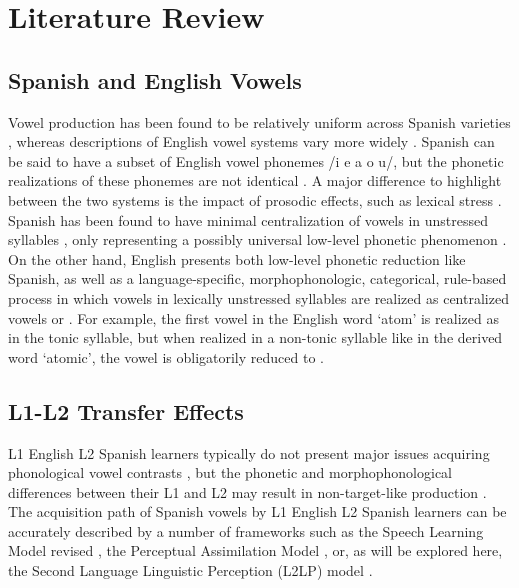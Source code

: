\documentclass[
  a4paper,
  11pt,
  twocolumn]{article}
\begin{document}
\section{Literature Review}

\subsection{Spanish and English Vowels}

Vowel production has been found to be relatively uniform across Spanish
varieties \cite{tomas1957documentos,quilis1993tratado}, whereas
descriptions of English vowel systems vary more widely
\cite{ladefoged2015course,bradlow1995comparative}. Spanish can be said
to have a subset of English vowel phonemes /i e a o u/, but the phonetic
realizations of these phonemes are not identical
\cite{bradlow1995comparative}. A major difference to highlight between
the two systems is the impact of prosodic effects, such as lexical
stress \cite{gordon2017acoustic}. Spanish has been found to have minimal
centralization of vowels in unstressed syllables
\cite{martinez1984fonetica,tomas1957documentos}, only representing a
possibly universal low-level phonetic phenomenon
\cite{kapatsinski2020vowel}. On the other hand, English presents both
low-level phonetic reduction like Spanish, as well as a
language-specific, morphophonologic, categorical, rule-based process in
which vowels in lexically unstressed syllables are realized as
centralized vowels \textipa{[I]} or \textipa{[@]}
\cite{bybee2003phonology,barnes2008strength,fourakis1991tempo}. For
example, the first vowel in the English word `atom' is realized as
\textipa{[\ae]} in the tonic syllable, but when realized in a non-tonic
syllable like in the derived word `atomic', the vowel is obligatorily
reduced to \textipa{[@]}.

\subsection{L1-L2 Transfer Effects}

L1 English L2 Spanish learners typically do not present major issues
acquiring phonological vowel contrasts \cite{morrison2003perception},
but the phonetic and morphophonological differences between their L1 and
L2 may result in non-target-like production
\cite{aldrich2014acquisition,cobb2009pronunciacion,cobb2015adult,iruela1997adquisicion,menke2010second}.
The acquisition path of Spanish vowels by L1 English L2 Spanish learners
can be accurately described by a number of frameworks such as the Speech
Learning Model revised \cite{flege2021revised}, the Perceptual
Assimilation Model \cite{best2007nonnative}, or, as will be explored
here, the Second Language Linguistic Perception (L2LP) model
\cite{escudero2004bridging,escudero2005linguistic,escudero2007second,escudero2009linguistic,van2015learning}.
\end{document}
